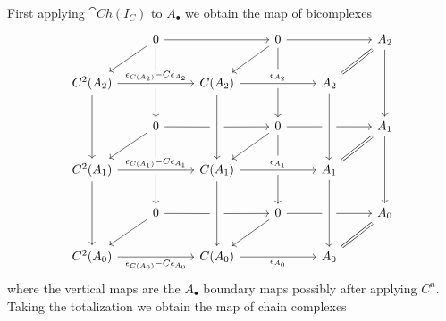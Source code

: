 First applying $\cat{Ch}(I_C)$ to $A_\bullet$ we obtain the map of bicomplexes
\[\begin{tikzcd}
	& 0 && 0 && {A_2} \\
	{C^2(A_2)} && {C(A_2)} && {A_2} \\
	& 0 && 0 && {A_1} \\
	{C^2(A_1)} && {C(A_1)} && {A_1} \\
	& 0 && 0 && {A_0} \\
	{C^2(A_0)} && {C(A_0)} && {A_0}
	\arrow[from=3-6, to=5-6]
	\arrow[from=1-6, to=3-6]
	\arrow["{\epsilon_{C(A_0)}-C\epsilon_{A_0}}"', from=6-1, to=6-3]
	\arrow["{\epsilon_{A_0}}"', from=6-3, to=6-5]
	\arrow[Rightarrow, no head, from=5-6, to=6-5]
	\arrow[""{name=0, anchor=center, inner sep=0}, from=4-5, to=6-5]
	\arrow[Rightarrow, no head, from=3-6, to=4-5]
	\arrow[Rightarrow, no head, from=1-6, to=2-5]
	\arrow[""{name=1, anchor=center, inner sep=0}, from=2-5, to=4-5]
	\arrow[from=1-4, to=1-6]
	\arrow[from=1-2, to=1-4]
	\arrow[from=4-1, to=6-1]
	\arrow[""{name=2, anchor=center, inner sep=0}, from=4-3, to=6-3]
	\arrow[""{name=3, anchor=center, inner sep=0}, "{\epsilon_{C(A_1)}-C\epsilon_{A_1}}", from=4-1, to=4-3]
	\arrow[""{name=4, anchor=center, inner sep=0}, "{\epsilon_{A_1}}", from=4-3, to=4-5]
	\arrow[""{name=5, anchor=center, inner sep=0}, "{\epsilon_{A_2}}", from=2-3, to=2-5]
	\arrow[""{name=6, anchor=center, inner sep=0}, "{\epsilon_{C(A_2)}-C\epsilon_{A_2}}", from=2-1, to=2-3]
	\arrow[from=2-1, to=4-1]
	\arrow[""{name=7, anchor=center, inner sep=0}, from=2-3, to=4-3]
	\arrow[from=3-4, to=4-3]
	\arrow[from=3-2, to=4-1]
	\arrow[from=1-2, to=2-1]
	\arrow[from=1-4, to=2-3]
	\arrow[from=5-4, to=6-3]
	\arrow[from=5-2, to=6-1]
	\arrow[shorten >=11pt, no head, from=1-4, to=5]
	\arrow[shorten <=3pt, from=5, to=3-4]
	\arrow[shorten >=10pt, no head, from=1-2, to=6]
	\arrow[shorten >=5pt, no head, from=3-4, to=1]
	\arrow[shorten <=5pt, from=1, to=3-6]
	\arrow[shorten >=5pt, no head, from=5-4, to=0]
	\arrow[shorten <=5pt, from=0, to=5-6]
	\arrow[shorten <=3pt, from=6, to=3-2]
	\arrow[shorten >=5pt, no head, from=3-2, to=7]
	\arrow[shorten <=5pt, from=7, to=3-4]
	\arrow[shorten >=11pt, no head, from=3-4, to=4]
	\arrow[shorten <=3pt, from=4, to=5-4]
	\arrow[shorten >=5pt, no head, from=5-2, to=2]
	\arrow[shorten <=5pt, from=2, to=5-4]
	\arrow[shorten >=10pt, no head, from=3-2, to=3]
	\arrow[shorten <=3pt, from=3, to=5-2]
\end{tikzcd}\]
where the vertical maps are the $A_\bullet$ boundary maps possibly after applying $C^n$. Taking the totalization we obtain the map of chain complexes
